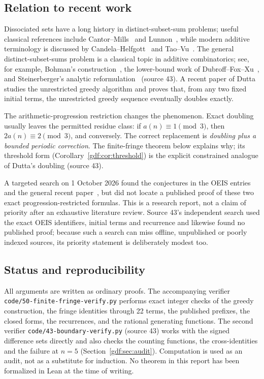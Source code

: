 \documentclass[11pt,a4paper]{article}
\numberwithin{equation}{section}
\theoremstyle{definition}
\theoremstyle{remark}
\theoremstyle{plain}
\newcommand{\file}[1]{\nolinkurl{#1}}
\newcommand{\src}[1]{\textup{(source #1)}}
\begin{document}
\subsection{Relation to recent work}\label{gdf:sec:recent}

Dissociated sets have a long history in distinct-subset-sum problems; useful
classical references include Cantor--Mills~\cite{CantorMills1966} and
Lunnon~\cite{Lunnon1988}, while modern additive terminology is discussed by
Candela--Helfgott~\cite{CandelaHelfgott2015} and Tao--Vu~\cite{TaoVu2006}.
The general distinct-subset-sums problem is a classical topic in additive
combinatorics; see, for example, Bohman's construction~\cite{Bohman1998}, the
lower-bound work of Dubroff--Fox--Xu~\cite{DubroffFoxXu2021}, and
Steinerberger's analytic reformulation~\cite{Steinerberger2023} \src{43}.
A recent paper of
Dutta~\cite{Dutta2026} studies the unrestricted greedy algorithm and proves
that, from any two fixed initial terms, the unrestricted greedy sequence
eventually doubles exactly.

The arithmetic-progression restriction changes the phenomenon.  Exact
doubling usually leaves the permitted residue class: if $a(n)\equiv1\pmod3$,
then $2a(n)\equiv2\pmod3$, and conversely.  The correct replacement is
\emph{doubling plus a bounded periodic correction}.  The finite-fringe theorem
below explains why; its threshold form (Corollary~\ref{gdf:cor:threshold})
is the explicit constrained analogue of Dutta's doubling \src{43}.

A targeted search on 1 October 2026 found the conjectures in the OEIS entries
and the general recent paper~\cite{Dutta2026}, but did not locate a published
proof of these two exact progression-restricted formulas.  This is a research
report, not a claim of priority after an exhaustive literature review.
Source 43's independent search used the exact OEIS identifiers, initial terms
and recurrence and likewise found no published proof; because such a search
can miss offline, unpublished or poorly indexed sources, its priority
statement is deliberately modest too.

\subsection{Status and reproducibility}\label{gdf:sec:status}

All arguments are written as ordinary proofs.  The accompanying
verifier \file{code/50-finite-fringe-verify.py} performs exact integer
checks of the greedy construction,
the fringe identities through 22 terms, the published prefixes, the closed
forms, the recurrences, and the rational generating functions.  The second
verifier \file{code/43-boundary-verify.py} (source 43) works with the signed
difference sets directly and also checks the counting functions, the
cross-identities and the failure at $n=5$
(Section~\ref{gdf:sec:audit}).  Computation is
used as an audit, not as a substitute for induction.  No theorem in this
report has been formalized in Lean at the time of writing.
\end{document}
